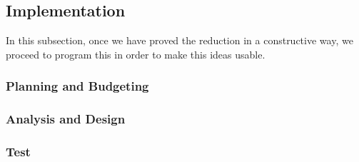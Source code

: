 \subsection{Implementation}

In this subsection, once we have proved the reduction in a constructive way, we proceed to program this in order to make this ideas usable.

\subsubsection{Planning and Budgeting}



\subsubsection{Analysis and Design}

\subsubsection{Test}

